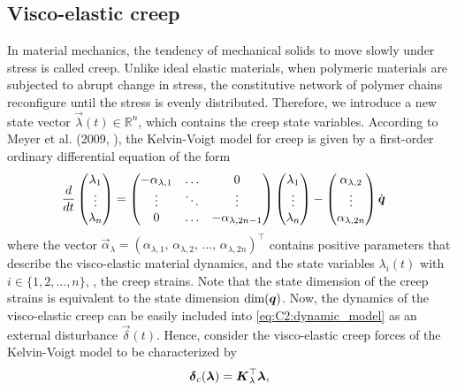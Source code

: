 \subsection{Visco-elastic creep}
\noindent In material mechanics, the tendency of mechanical solids to move slowly under stress is called creep. Unlike ideal elastic materials, when polymeric materials are subjected to abrupt change in stress, the constitutive network of polymer chains reconfigure until the stress is evenly distributed. Therefore, we introduce a new state vector $\vec{\lambda}(t)\in \mathbb{R}^n$, which contains the creep state variables. According to Meyer et al. (2009, \cite{Meyer2009}), the Kelvin-Voigt model for creep is given by a first-order ordinary differential equation of the form
%
\begin{align}
\frac{d}{dt}\begin{pmatrix} {\lambda}_1 \\ \vdots \\ {\lambda}_n \end{pmatrix} & = \begin{pmatrix} -\alpha_{\lambda,1} & \hdots & 0 \\
\vdots & \ddots & \vdots  \\ 0 & \hdots & -\alpha_{\lambda,2n-1} \end{pmatrix} \begin{pmatrix} \lambda_1 \\ \vdots \\ \lambda_n \end{pmatrix} -\begin{pmatrix} \alpha_{\lambda,2} \\ \vdots \\ \alpha_{\lambda,2n} \end{pmatrix} {\dot{\boldsymbol{q}}}
\label{eq:C2:creepmodel}
  \end{align}
%
\noindent where the vector $\vec{\alpha}_\lambda = (\alpha_{\lambda,1},\,\alpha_{\lambda,2},\,...,\,\alpha_{\lambda,2n})^\top$ contains positive parameters that describe the visco-elastic material dynamics, and the state variables $\lambda_i(t)$ with $i \in \{1,2,...,n\}$,  \ie, the creep strains. Note that the state dimension of the creep strains is equivalent to the state dimension $\text{dim}({\boldsymbol{q}})$. Now, the dynamics of the visco-elastic creep can be easily included into
\eqref{eq:C2:dynamic_model} as an external disturbance $\vec{\delta}(t)$. Hence, consider the visco-elastic creep forces of the Kelvin-Voigt model to be characterized by
%
\begin{equation}
\boldsymbol{\delta}_c({\boldsymbol{\lambda}}) = \boldsymbol{K}_{\lambda}^\top \boldsymbol{\lambda},
\label{eq:C2:creepcompliance}
\end{equation}
